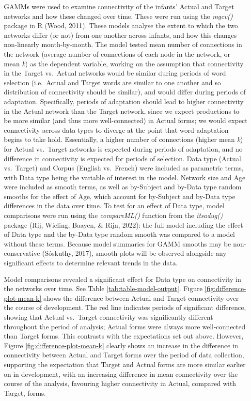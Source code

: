 \documentclass[
  man]{apa6}
\begin{document}
GAMMs were used to examine connectivity of the infants' Actual and Target networks and how these changed over time. These were run using the \emph{mgcv()} package in R (Wood, 2011). These models analyse the extent to which the two networks differ (or not) from one another across infants, and how this changes non-linearly month-by-month. The model tested mean number of connections in the network (average number of connections of each node in the network, or mean \emph{k}) as the dependent variable, working on the assumption that connectivity in the Target vs.~Actual networks would be similar during periods of word selection (i.e.~Actual and Target words are similar to one another and so distribution of connectivity should be similar), and would differ during periods of adaptation. Specifically, periods of adaptation should lead to higher connectivity in the Actual network than the Target network, since we expect productions to be more similar (and thus more well-connected) in Actual forms; we would expect connectivity across data types to diverge at the point that word adaptation begins to take hold. Essentially, a higher number of connections (higher mean \emph{k}) for Actual vs.~Target networks is expected during periods of adaptation, and no difference in connectivity is expected for periods of selection. Data type (Actual vs.~Target) and Corpus (English vs.~French) were included as parametric terms, with Data type being the variable of interest in the model. Network size and Age were included as smooth terms, as well as by-Subject and by-Data type random smooths for the effect of Age, which account for by-Subject and by-Data type differences in the data over time. To test for an effect of Data type, model comparisons were run using the \emph{compareML()} function from the \emph{itsadug()} package (Rij, Wieling, Baayen, \& Rijn, 2022): the full model including the effect of Data type and the by-Data type random smooth was compared to a model without these terms. Because model summaries for GAMM smooths may be non-conservative (Sóskuthy, 2017), smooth plots will be observed alongside any significant effects to determine relevant trends in the data.

Model comparisons revealed a significant effect for Data type on connectivity in the networks over time. See Table \ref{tab:table-model-output}. Figure \ref{fig:difference-plot-mean-k} shows the difference between Actual and Target connectivity over the course of development. The red line indicates periods of significant difference, showing that Actual vs.~Target connectivity was significantly different throughout the period of analysis; Actual forms were always more well-connected than Target forms. This contrasts with the expectations set out above. However, Figure \ref{fig:difference-plot-mean-k} clearly shows an increase in the difference in connectivity between Actual and Target forms over the period of data collection, supporting the expectation that Target and Actual forms are more similar earlier on in development, with an increasing difference in mean connectivity over the course of the analysis, favouring higher connectivity in Actual, compared with Target, forms.
\end{document}
